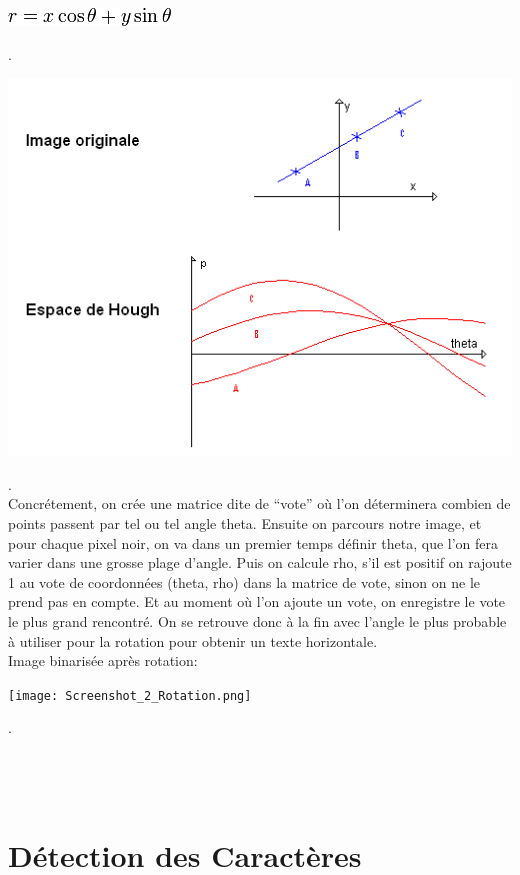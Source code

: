 \documentclass [french,12pt]{article}
\begin{document}
\begin{center} \includegraphics[scale=0.8]{r.png} \end{center}.
\\
\begin{center} \includegraphics[scale=0.7]{Hough_sample2.png} \end{center}.
\\

Concrétement, on crée une matrice dite de “vote” où l’on déterminera combien de points passent par tel ou tel angle theta. Ensuite on parcours notre image, et pour chaque pixel noir, on va dans un premier temps définir theta, que l’on fera varier dans une grosse plage d’angle. Puis on calcule rho, s’il est positif on rajoute 1 au vote de coordonnées (theta, rho) dans la matrice de vote, sinon on ne le prend pas en compte. Et au moment où l’on ajoute un vote, on enregistre le vote le plus grand rencontré. On se retrouve donc à la fin avec l’angle le plus probable à  utiliser pour la rotation pour obtenir un texte horizontale.
\\
Image binarisée après rotation:
\\
\begin{center} \texttt{[image: Screenshot\_2\_Rotation.png]} \end{center}.
\\
\\
\\
\\
\section{Détection des Caractères}
\end{document}
